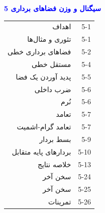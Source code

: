 \documentclass[a4paper,12pt]{report}
\begin{document}
	
	\thispagestyle{empty}
	\textcolor{blue}{\textbf{\Huge{5 }\huge{سیگنال و وزن فضاهای برداری}}}\\
	
		\begin{center}
			\begin{tabular}{r r}
				اهداف \hspace{7cm} & 5-1\\
				
				تئوری و مثال‌ها & 5-1\\
				
				فضاهای برداری خطی & 5-2\\
				
				\hspace{1cm}مستقل خطی & 5-4\\
				
				\hspace{1cm}پدید آوردن یک فضا & 5-5\\
				
				\hspace{1cm}ضرب داخلی & 5-6\\
				
				\hspace{1cm}نُرم & 5-6\\
				
				\hspace{1cm}تعامد & 5-7\\
				
				\hspace{2cm}تعامد گرام-اشمیت & 5-7\\
				 
				\hspace{1cm}بسط بردار & 5-9\\

				\hspace{2cm}بردارهای پایه متقابل & 5-10\\
				
				خلاصه نتایج & 5-13\\
				
				  سخن آخر & 5-24\\ 
				  
				  سخن آخر & 5-25\\
				  
				  تمرینات & 5-26\\				  
			\end{tabular}
		\end{center}
\end{document}
